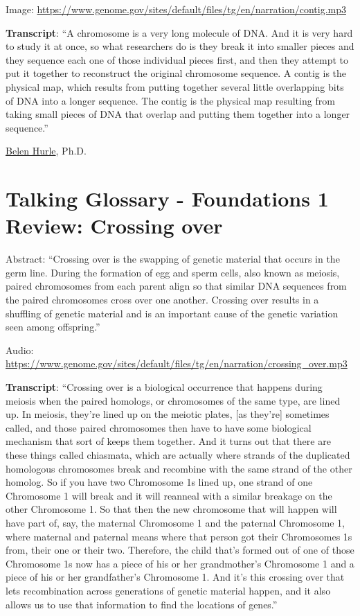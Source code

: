 \documentclass[
]{book}
\begin{document}
Image: \url{https://www.genome.gov/sites/default/files/tg/en/narration/contig.mp3}

\textbf{Transcript}: ``A chromosome is a very long molecule of DNA. And it is very hard to study it at once, so what researchers do is they break it into smaller pieces and they sequence each one of those individual pieces first, and then they attempt to put it together to reconstruct the original chromosome sequence. A contig is the physical map, which results from putting together several little overlapping bits of DNA into a longer sequence. The contig is the physical map resulting from taking small pieces of DNA that overlap and putting them together into a longer sequence.''

\href{https://www.genome.gov/staff/Belen-Hurle-PhD}{Belen Hurle}, Ph.D.

\hypertarget{talking-glossary---foundations-1-review-crossing-over}{%
\section{Talking Glossary - Foundations 1 Review: Crossing over}\label{talking-glossary---foundations-1-review-crossing-over}}

Abstract: ``Crossing over is the swapping of genetic material that occurs in the germ line. During the formation of egg and sperm cells, also known as meiosis, paired chromosomes from each parent align so that similar DNA sequences from the paired chromosomes cross over one another. Crossing over results in a shuffling of genetic material and is an important cause of the genetic variation seen among offspring.''

Audio:
\url{https://www.genome.gov/sites/default/files/tg/en/narration/crossing_over.mp3}

\textbf{Transcript}: ``Crossing over is a biological occurrence that happens during meiosis when the paired homologs, or chromosomes of the same type, are lined up. In meiosis, they're lined up on the meiotic plates, {[}as they're{]} sometimes called, and those paired chromosomes then have to have some biological mechanism that sort of keeps them together. And it turns out that there are these things called chiasmata, which are actually where strands of the duplicated homologous chromosomes break and recombine with the same strand of the other homolog. So if you have two Chromosome 1s lined up, one strand of one Chromosome 1 will break and it will reanneal with a similar breakage on the other Chromosome 1. So that then the new chromosome that will happen will have part of, say, the maternal Chromosome 1 and the paternal Chromosome 1, where maternal and paternal means where that person got their Chromosomes 1s from, their one or their two. Therefore, the child that's formed out of one of those Chromosome 1s now has a piece of his or her grandmother's Chromosome 1 and a piece of his or her grandfather's Chromosome 1. And it's this crossing over that lets recombination across generations of genetic material happen, and it also allows us to use that information to find the locations of genes.''
\end{document}
